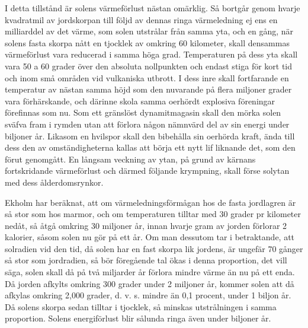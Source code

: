 \documentclass[a4paper, 12pt, oneside, swedish]{article}
\begin{document}
I detta tillstånd är solens värmeförlust nästan omärklig. Så bortgår genom hvarje kvadratmil av jordskorpan till följd av dennas ringa värmeledning ej ens en milliarddel av det värme, som solen utstrålar från samma yta, och en gång, när solens fasta skorpa nått en tjocklek av omkring 60 kilometer, skall densammas värmeförlust vara reducerad i samma höga grad. Temperaturen på dess yta skall vara 50 a 60 grader över den absoluta nollpunkten och endast stiga för kort tid och inom små områden vid vulkaniska utbrott. I dess inre skall fortfarande en temperatur av nästan samma höjd som den nuvarande på flera miljoner grader vara förhärskande, och därinne skola samma oerhördt explosiva föreningar förefinnas som nu. Som ett gränslöst dynamitmagasin skall den mörka solen sväfva fram i rymden utan att förlora någon nämnvärd del av sin energi under biljoner år. Likasom en hvilspor skall den bibehålla sin oerhörda kraft, ända till dess den av omständigheterna kallas att börja ett nytt lif liknande det, som den förut genomgått. En långsam veckning av ytan, på grund av kärnans fortskridande värmeförlust och därmed följande krympning, skall förse solytan med dess ålderdomsrynkor.

Ekholm har beräknat, att om värmeledningsförmågan hos de fasta jordlagren är så stor som hos marmor, och om temperaturen tilltar med 30 grader pr kilometer nedåt, så åtgå omkring 30 miljoner år, innan hvarje gram av jorden förlorar 2 kalorier, såsom solen nu gör på ett år. Om man dessutom tar i betraktande, att solradien vid den tid, då solen har en fast skorpa lik jordens, är ungefär 70 gånger så stor som jordradien, så bör föregående tal ökas i denna proportion, det vill säga, solen skall då på två miljarder år förlora mindre värme än nu på ett enda. Då jorden afkylts omkring 300 grader under 2 miljoner år, kommer solen att då afkylas omkring 2,000 grader, d. v. s. mindre än 0,1 procent, under 1 biljon år. Då solens skorpa sedan tilltar i tjocklek, så minskas utstrålningen i samma proportion. Solens energiförlust blir sålunda ringa även under biljoner år.
\end{document}

